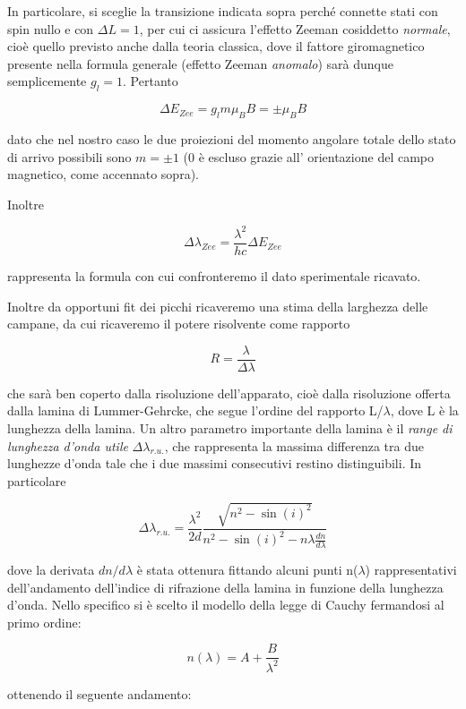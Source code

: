 \documentclass{article}
\begin{document}
In particolare, si sceglie la transizione indicata sopra perché connette
stati con spin nullo e con $\Delta L = 1$, per cui ci assicura l'effetto
Zeeman cosiddetto \textit{normale}, cioè quello previsto anche dalla 
teoria classica, dove il fattore giromagnetico presente nella formula 
generale (effetto Zeeman \textit{anomalo}) sarà dunque semplicemente
$g_l = 1$. Pertanto

\[
\Delta E_{Zee} = g_l m \mu_B B = \pm \mu_B B
\]

dato che nel nostro caso le due proiezioni del momento angolare totale
dello stato di arrivo possibili sono $m = \pm 1$ (0 è escluso grazie all'
orientazione del campo magnetico, come accennato sopra).

Inoltre

\[
\Delta\lambda_{Zee} = \frac{\lambda^2}{hc}\Delta E_{Zee}
\]

rappresenta la formula con cui confronteremo il dato sperimentale
ricavato.

Inoltre da opportuni fit dei picchi ricaveremo una stima della larghezza
delle campane, da cui ricaveremo il potere risolvente come rapporto

\[
R = \frac{\lambda}{\Delta\lambda}    
\]

che sarà ben coperto dalla risoluzione dell'apparato, cioè dalla
risoluzione offerta dalla lamina di Lummer-Gehrcke, che segue l'ordine
del rapporto L/$\lambda$, dove L è la lunghezza della lamina.
Un altro parametro importante della lamina è il \textit{range di 
lunghezza d'onda utile} $\Delta\lambda_{r.u.}$, che rappresenta la
massima differenza tra due lunghezze d'onda tale che i due massimi 
consecutivi restino distinguibili. In particolare

\[
\Delta\lambda_{r.u.} = \frac{\lambda^2}{2d}\frac{\sqrt{n^2-\sin(i)^2}}{n^2-\sin(i)^2-n\lambda\frac{dn}{d\lambda}}
\]

dove la derivata $dn/d\lambda$ è stata ottenura fittando alcuni punti 
n($\lambda$) rappresentativi dell'andamento dell'indice di rifrazione
della lamina in funzione della lunghezza d'onda. Nello specifico si è
scelto il modello della legge di Cauchy fermandosi al primo ordine:

\[
n(\lambda) = A + \frac{B}{\lambda^2}    
\]

ottenendo il seguente andamento:
\end{document}
